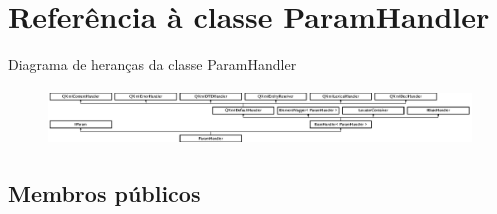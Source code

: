 \hypertarget{class_param_handler}{\section{Referência à classe Param\-Handler}
\label{class_param_handler}
}
Diagrama de heranças da classe Param\-Handler\begin{figure}[H]
\begin{center}
\leavevmode
\includegraphics[height=1.502347cm]{class_param_handler}
\end{center}
\end{figure}
\subsection*{Membros públicos}
